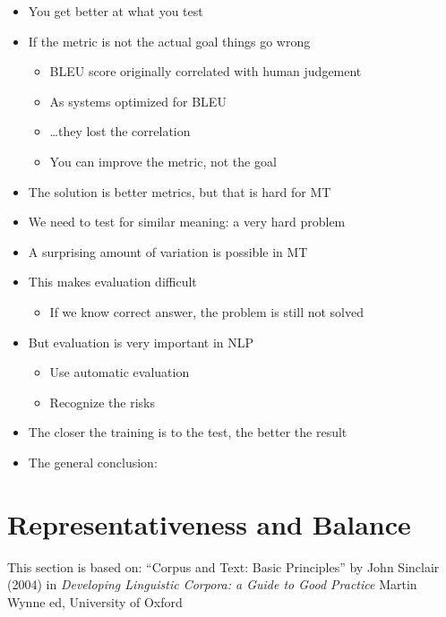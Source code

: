 \documentclass[a4paper,landscape,headrule,footrule,xetex]{foils}
\begin{document}


\begin{itemize}
\item {\large You get better at what you test}
\item If the metric is not the actual goal things go wrong
  \begin{itemize}
  \item  BLEU score originally correlated with human judgement
  \item As systems optimized for BLEU
  \item \ldots they lost the correlation
  \item You can  improve the metric, not the goal
  \end{itemize}
\item The solution is better metrics, but that is hard for MT
\item We need to test for similar meaning: a very hard problem
\end{itemize}



\begin{itemize}
\item A surprising amount of variation is possible in MT
\item This makes evaluation difficult
  \begin{itemize}
  \item If we know  correct answer, the problem is still not solved
  \end{itemize}
\item But evaluation is very important in NLP
  \begin{itemize}
  \item Use automatic evaluation
  \item Recognize the risks
  \end{itemize}
\item The closer the training is to the test, the better the result
\item The general conclusion: 
\end{itemize}

\section{Representativeness and Balance}
\MyLogo{}
This section is based on: ``Corpus and Text: Basic Principles'' by
John Sinclair (2004) in \textit{Developing Linguistic Corpora: a Guide
  to Good Practice} Martin Wynne ed, University of Oxford
\end{document}

